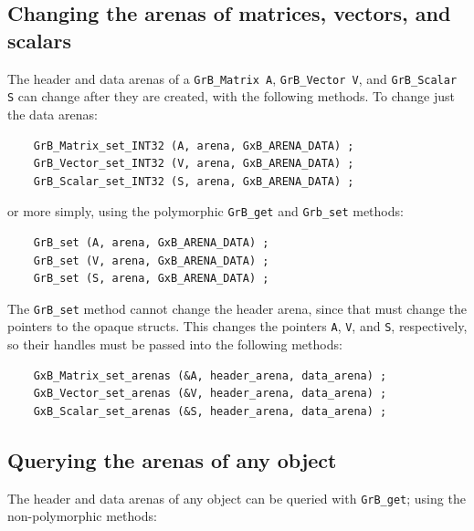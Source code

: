 \subsection{Changing the arenas of matrices, vectors, and scalars}

The header and data arenas of a \verb'GrB_Matrix A', \verb'GrB_Vector V', and
\verb'GrB_Scalar S' can change after they are created, with the following
methods.  To change just the data arenas:

{\footnotesize
\begin{verbatim}
    GrB_Matrix_set_INT32 (A, arena, GxB_ARENA_DATA) ;
    GrB_Vector_set_INT32 (V, arena, GxB_ARENA_DATA) ;
    GrB_Scalar_set_INT32 (S, arena, GxB_ARENA_DATA) ;
\end{verbatim}}

\noindent
or more simply, using the polymorphic \verb'GrB_get' and \verb'Grb_set'
methods:

{\footnotesize
\begin{verbatim}
    GrB_set (A, arena, GxB_ARENA_DATA) ;
    GrB_set (V, arena, GxB_ARENA_DATA) ;
    GrB_set (S, arena, GxB_ARENA_DATA) ;
\end{verbatim}}

The \verb'GrB_set' method cannot change the header arena, since that must
change the pointers to the opaque structs.  This changes the pointers \verb'A',
\verb'V', and \verb'S', respectively, so their handles must be passed into the
following methods:

{\footnotesize
\begin{verbatim}
    GxB_Matrix_set_arenas (&A, header_arena, data_arena) ;
    GxB_Vector_set_arenas (&V, header_arena, data_arena) ;
    GxB_Scalar_set_arenas (&S, header_arena, data_arena) ;
\end{verbatim}}

\subsection{Querying the arenas of any object}

The header and data arenas of any object can be queried with \verb'GrB_get';
using the non-polymorphic methods:

